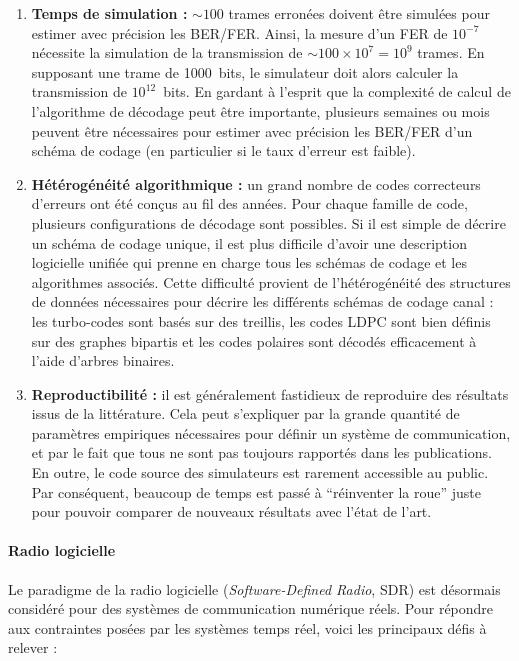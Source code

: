\begin{enumerate}
  \item \textbf{Temps de simulation :}
    $\sim 100$ trames erronées doivent être simulées pour estimer avec précision
    les BER/FER. Ainsi, la mesure d'un FER de $10^{-7}$ nécessite la simulation
    de la transmission de $\sim100\times 10^7=10^9$ trames. En supposant une
    trame de 1000~bits, le simulateur doit alors calculer la transmission de
    $10^{12}$~bits. En gardant à l'esprit que la complexité de calcul de
    l'algorithme de décodage peut être importante, plusieurs semaines ou mois
    peuvent être nécessaires pour estimer avec précision les BER/FER d'un schéma
    de codage (en particulier si le taux d'erreur est faible).

  \item \textbf{Hétérogénéité algorithmique :}
    un grand nombre de codes correcteurs d'erreurs ont été conçus au fil des
    années. Pour chaque famille de code, plusieurs configurations de décodage
    sont possibles. Si il est simple de décrire un schéma de codage unique, il
    est  plus difficile d'avoir une description logicielle unifiée qui prenne en
    charge tous les schémas de codage et les algorithmes associés. Cette
    difficulté provient de l'hétérogénéité des structures de données nécessaires
    pour décrire les différents schémas de codage canal : les turbo-codes sont
    basés sur des treillis, les codes LDPC sont bien définis sur des graphes
    bipartis et les codes polaires sont décodés efficacement à l'aide d'arbres
    binaires.

  \item \textbf{Reproductibilité :}
    il est généralement fastidieux de reproduire des résultats issus de la
    littérature. Cela peut s'expliquer par la grande quantité de paramètres
    empiriques nécessaires pour définir un système de communication, et par le
    fait que tous ne sont pas toujours rapportés dans les publications. En
    outre, le code source des simulateurs est rarement accessible au public.
    Par conséquent, beaucoup de temps est passé à ``réinventer la roue'' juste
    pour pouvoir comparer de nouveaux résultats avec l'état de l'art.
\end{enumerate}

\paragraph{Radio logicielle}

Le paradigme de la radio logicielle (\emph{Software-Defined Radio}, SDR) est
désormais considéré pour des systèmes de communication numérique réels. Pour
répondre aux contraintes posées par les systèmes temps réel, voici les
principaux défis à relever :

